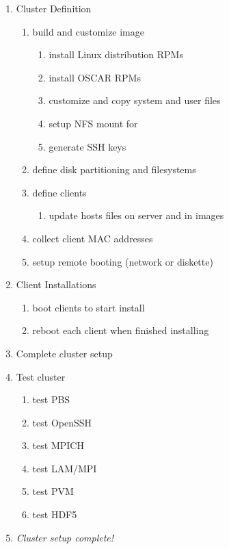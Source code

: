 \begin{enumerate}
\item Cluster Definition
  \begin{enumerate}
  \item build and customize image
    \begin{enumerate}
    \item install Linux distribution RPMs
    \item install OSCAR RPMs
    \item customize and copy system and user files
    \item setup NFS mount for 
    \item generate SSH keys
    \end{enumerate}
  \item define disk partitioning and filesystems
  \item define clients
    \begin{enumerate}
    \item update hosts files on server and in images
    \end{enumerate}
  \item collect client MAC addresses
  \item setup remote booting (network or diskette)
  \end{enumerate}
  
\item Client Installations
  \begin{enumerate}
  \item boot clients to start install
  \item reboot each client when finished installing
  \end{enumerate}
\item Complete cluster setup
\item Test cluster
  \begin{enumerate}
  \item test PBS
  \item test OpenSSH
  \item test MPICH
  \item test LAM/MPI
  \item test PVM
  \item test HDF5
  \end{enumerate}
\item \emph{Cluster setup complete!}
\end{enumerate}

